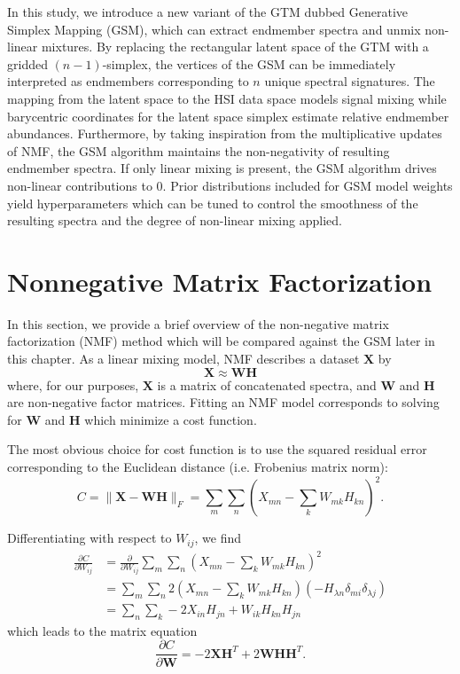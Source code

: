 In this study, we introduce a new variant of the GTM dubbed Generative Simplex
Mapping (GSM), which can extract endmember spectra and unmix non-linear
mixtures. By replacing the rectangular latent space of the GTM with a gridded
$(n-1)$-simplex, the vertices of the GSM can be immediately interpreted as
endmembers corresponding to $n$ unique spectral signatures. The mapping from
the latent space to the HSI data space models signal mixing while barycentric
coordinates for the latent space simplex estimate relative endmember abundances.
Furthermore, by taking inspiration from the multiplicative updates of NMF, the
GSM algorithm maintains the non-negativity of resulting endmember spectra. If
only linear mixing is present, the GSM algorithm drives non-linear contributions
to $0$. Prior distributions included for GSM model weights yield hyperparameters
which can be tuned to control the smoothness of the resulting spectra and the
degree of non-linear mixing applied.

\section{Nonnegative Matrix Factorization}

In this section, we provide a brief overview of the non-negative matrix
factorization (NMF) method which will be compared against the GSM later in this
chapter. As a linear mixing model, NMF describes a dataset $\mathbf{X}$ by
\begin{equation}
  \mathbf{X} \approx \mathbf{W}\mathbf{H}
\end{equation}
where, for our purposes, $\mathbf{X}$ is a matrix of concatenated spectra, and
$\mathbf{W}$ and $\mathbf{H}$ are non-negative factor matrices. Fitting an NMF
model corresponds to solving for $\mathbf{W}$ and $\mathbf{H}$ which minimize
a cost function.

The most obvious choice for cost function is to use the squared residual error
corresponding to the Euclidean distance (i.e. Frobenius matrix norm):
\begin{equation}
  C = \lVert  \mathbf{X} - \mathbf{W}\mathbf{H} \rVert_F = \sum_m\sum_n \left( X_{mn} - \sum_k W_{mk}H_{kn} \right)^2.
\end{equation}

Differentiating with respect to $W_{ij}$, we find
\begin{align}
  \frac{\partial C}{\partial W_{ij}} &= \frac{\partial}{\partial W_{ij}}\sum_m\sum_n\left( X_{mn} - \sum_kW_{mk}H_{kn} \right)^2 \\
                                     &= \sum_m\sum_n 2\left( X_{mn} - \sum_k W_{mk}H_{kn} \right) \left( - H_{\lambda n}\delta_{mi}\delta_{\lambda j} \right)\\
                                     &= \sum_n\sum_k -2X_{in}H_{jn} + W_{ik}H_{kn}H_{jn}
\end{align}
which leads to the matrix equation
\begin{equation}
  \frac{\partial C}{\partial \mathbf{W}} = -2\mathbf{X}\mathbf{H}^T + 2\mathbf{W}\mathbf{H}\mathbf{H}^T.
\end{equation}

